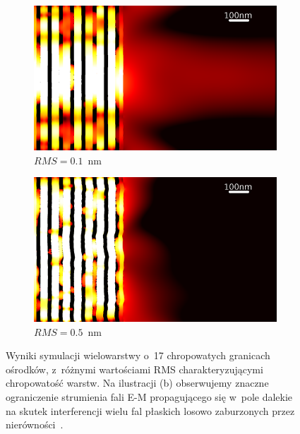 \begin{figure}
	\centering
	\begin{subfigure}[b]{.45\textwidth}
		\includegraphics[width=\textwidth]{images/multilayer/oer-rms01.png}
		\caption{$RMS=0.1$~nm}
	\end{subfigure}
	\begin{subfigure}[b]{.45\textwidth}
		\includegraphics[width=\textwidth]{images/multilayer/oer-rms05.png}
		\caption{$RMS=0.5$~nm}
	\end{subfigure}
	\caption{Wyniki symulacji wielowarstwy o~17 chropowatych granicach ośrodków, z~różnymi wartościami RMS charakteryzującymi chropowatość warstw. Na ilustracji (b) obserwujemy znaczne ograniczenie strumienia fali E-M propagującego się w~pole dalekie na skutek interferencji wielu fal płaskich losowo zaburzonych przez nierówności~\cite{pastuszczak2013engineering}.}
	\label{fig:rmsem}
	
\end{figure}

